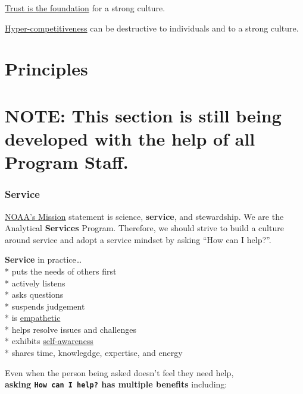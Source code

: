 \documentclass[
  letterpaper,
  DIV=11,
  numbers=noendperiod]{scrreprt}
\begin{document}
\href{https://www.youtube.com/watch?v=W5qQJhe7sLE}{Trust is the
foundation} for a strong culture.

\href{https://www.youtube.com/watch?v=jtpOYxsZj7o}{Hyper-competitiveness}
can be destructive to individuals and to a strong culture.

\section{Principles}\label{principles}

\section{NOTE: This section is still being developed with the help of
all Program
Staff.}\label{note-this-section-is-still-being-developed-with-the-help-of-all-program-staff.}

\subsubsection{Service}\label{service}

\href{https://www.noaa.gov/our-mission-and-vision}{NOAA's Mission}
statement is science, \textbf{service}, and stewardship. We are the
Analytical \textbf{Services} Program. Therefore, we should strive to
build a culture around service and adopt a service mindset by asking
``How can I help?''.

\textbf{Service} in practice\ldots{}\\
* puts the needs of others first\\
* actively listens\\
* asks questions\\
* suspends judgement\\
* is
\href{https://www.indeed.com/career-advice/career-development/how-to-be-empathetic}{empathetic}\\
* helps resolve issues and challenges\\
* exhibits
\href{https://www.indeed.com/career-advice/career-development/self-awareness-in-leadership}{self-awareness}\\
* shares time, knowlegdge, expertise, and energy

Even when the person being asked doesn't feel they need help,\\
\textbf{asking \texttt{How\ can\ I\ help?} has multiple benefits}
including:
\end{document}
